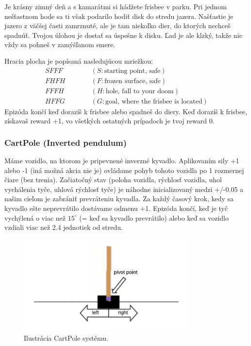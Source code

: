 \documentclass[letterpaper,12pt]{article}
\begin{document}
\indent\par Je krásny zimný deň a s kamarátmi si hádžete frisbee v parku. Pri jednom nešťastnom hode sa ti však podarilo hodiť disk do stredu jazera. Našťastie je jazero z väčšej časti zamrznuté, ale je tam niekoľko dier, do ktorých nechceš spadnúť. Tvojou úlohou je dostať sa úspešne k disku. Ľad je ale klzký, takže nie vždy sa pohneš v zamýšľanom smere.

Hracia plocha je popísaná nasledujúcou mriežkou:
\begin{align*}
SFFF    \quad\quad\quad   &(S: \text{starting point, safe})\\
FHFH    \quad\quad\quad   &(F: \text{frozen surface, safe})\\
FFFH    \quad\quad\quad   &(H: \text{hole, fall to your doom})\\
HFFG    \quad\quad\quad   &(G: \text{goal, where the frisbee is located})
\end{align*}
Epizóda končí keď dorazíš k frisbee alebo spadneš do diery. Keď dorazíš k frisbee, získavaš reward +1, vo všetkých ostatných prípadoch je tvoj reward 0.

\subsubsection*{CartPole (Inverted pendulum)}

\indent\par Máme vozidlo, na ktorom je pripevnené inverzné kyvadlo. Aplikovaním sily +1 alebo -1 (iná možná akcia nie je) ovládame pohyb tohoto vozidla po 1 rozmernej čiare (bez trenia). Začiatočný stav (poloha vozidla, rýchlosť vozidla, uhol vychálenia tyče, uhlová rýchlosť tyče) je náhodne inicializovaný medzi +/-0.05 a našim cieľom je zabrániť prevráteniu kyvadla. Za každý časový krok, kedy sa kyvadlo ešte neprevrátilo dostávame odmenu +1. Epizóda končí, keď je tyč vychýlená o viac než $15^\circ$ (= keď sa kyvadlo prevrátilo) alebo keď sa vozidlo vzdiali viac než 2.4 jednotiek od stredu.

\begin{figure}[H]
\centering
\includegraphics[width=9cm]{images/cartpole.jpg}
\caption{Ilustrácia CartPole systému.}
\end{figure}
\end{document}
